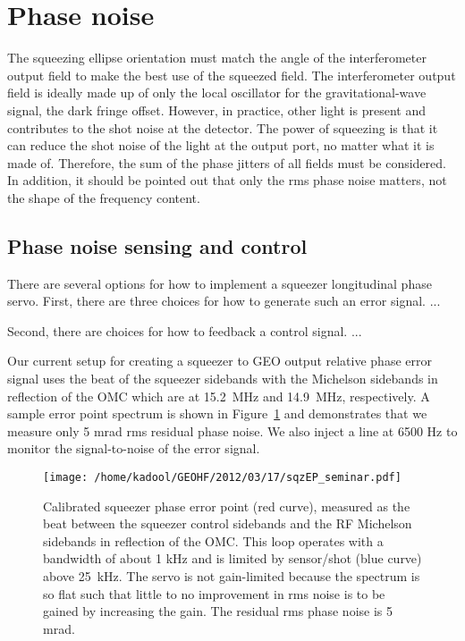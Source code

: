 \documentclass{ligodoc}
\begin{document}
\section{Phase noise}
The squeezing ellipse orientation must match the angle of the
interferometer output field to make the best use of the squeezed
field. The interferometer output field is ideally made up of only the
local oscillator for the gravitational-wave signal, the dark fringe
offset. However, in practice, other light is present and contributes
to the shot noise at the detector. The power of squeezing is that it
can reduce the shot noise of the light at the output port, no matter
what it is made of. Therefore, the sum of the phase jitters of all
fields must be considered. In addition, it should be pointed out that
only the rms phase noise matters, not the shape of the frequency
content.


\subsection{Phase noise sensing and control}
There are several options for how to implement a squeezer longitudinal
phase servo. First, there are three choices for how to generate such
an error signal. ...

Second, there are choices for how to feedback a control signal. ...

Our current setup for creating a squeezer to GEO output relative phase
error signal uses the beat of the squeezer sidebands with the
Michelson sidebands in reflection of the OMC which are at 15.2~MHz and
14.9~MHz, respectively. A sample error point spectrum is shown in
Figure~\ref{fig:sqzEP} and demonstrates that we measure only 5 mrad
rms residual phase noise. We also inject a line at 6500 Hz to monitor
the signal-to-noise of the error signal.

\begin{figure}
\begin{centering}
\texttt{[image: /home/kadool/GEOHF/2012/03/17/sqzEP\_seminar.pdf]}
\caption{Calibrated squeezer phase error point (red curve), measured
  as the beat between the squeezer control sidebands and the RF
  Michelson sidebands in reflection of the OMC. This loop operates
  with a bandwidth of about 1 kHz and is limited by sensor/shot (blue
  curve) above 25~kHz. The servo is not gain-limited because the
  spectrum is so flat such that little to no improvement in rms
  noise is to be gained by increasing the gain. The residual rms phase
  noise is 5 mrad.}
\label{fig:sqzEP}
\end{centering}
\end{figure}
\end{document}
